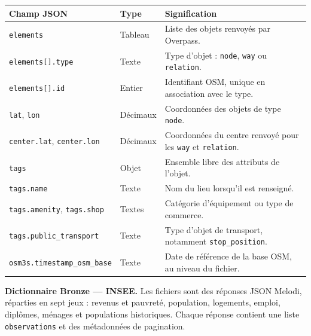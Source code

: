 \documentclass[11pt,a4paper]{article}
\begin{document}
\begin{center}
\small
\begin{tabular}{@{}p{4.8cm}p{2.5cm}p{7.6cm}@{}}
\toprule
Champ JSON & Type & Signification \\
\midrule
\texttt{elements} & Tableau & Liste des objets renvoyés par Overpass. \\
\texttt{elements[].type} & Texte & Type d'objet : \texttt{node}, \texttt{way} ou \texttt{relation}. \\
\texttt{elements[].id} & Entier & Identifiant OSM, unique en association avec le type. \\
\texttt{lat}, \texttt{lon} & Décimaux & Coordonnées des objets de type \texttt{node}. \\
\texttt{center.lat}, \texttt{center.lon} & Décimaux & Coordonnées du centre renvoyé pour les \texttt{way} et \texttt{relation}. \\
\texttt{tags} & Objet & Ensemble libre des attributs de l'objet. \\
\texttt{tags.name} & Texte & Nom du lieu lorsqu'il est renseigné. \\
\texttt{tags.amenity}, \texttt{tags.shop} & Textes & Catégorie d'équipement ou type de commerce. \\
\texttt{tags.public\_transport} & Texte & Type d'objet de transport, notamment \texttt{stop\_position}. \\
\texttt{osm3s.timestamp\_osm\_base} & Texte & Date de référence de la base OSM, au niveau du fichier. \\
\bottomrule
\end{tabular}
\end{center}

\noindent\textbf{Dictionnaire Bronze --- INSEE.} Les fichiers  sont des réponses JSON Melodi, réparties en sept jeux : revenus et pauvreté, population, logements, emploi, diplômes, ménages et populations historiques. Chaque réponse contient une liste \texttt{observations} et des métadonnées de pagination.
\end{document}
